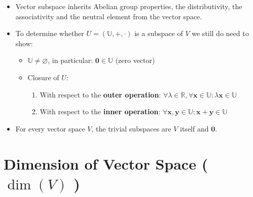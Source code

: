 \begin{itemize}
    \item Vector subspace inherits Abelian group properties, the distributivity, the associativity and the neutral element from the vector space.

    \item To determine whether $U = (\mathbb{U}, +, \cdot)$ is a subspace of $V$ we still do need to show:
    \begin{itemize}
        \item $\mathbb{U} \neq \varnothing$, in particular: $\mathbf{0} \in \mathbb{U}$ (zero vector)
        \item Closure of $U$:
        \begin{enumerate}
            \item With respect to the \textbf{outer operation}: $\forall\lambda \in \mathbb{R}, \forall\mathbf{x} \in \mathbb{U} : \lambda \mathbf{x} \in \mathbb{U}$
            \item With respect to the \textbf{inner operation}: $\forall\mathbf{x, y} \in \mathbb{U} : \mathbf{x + y} \in \mathbb{U}$
        \end{enumerate}
    \end{itemize}

    \item For every vector space $V$, the trivial subspaces are $V$ itself and ${\mathbf{0}}$.
    
\end{itemize}








\section{Dimension of Vector Space ( $\dim(V)$ ) \cite{mfml-1}}\label{lin-alg: Dimension-vector-space}

